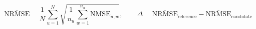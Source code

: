 \documentclass{article}
\begin{document}
\fontsize{22}{29}\selectfont
\[
\overline{\mathrm{NRMSE}}=\frac1N\sum_{u=1}^{N}\sqrt{\frac1{n_u}\sum_{w=1}^{n_u}\mathrm{NMSE}_{u,w}},\qquad \Delta=\overline{\mathrm{NRMSE}}_{\mathrm{reference}}-\overline{\mathrm{NRMSE}}_{\mathrm{candidate}}
\]
\end{document}

